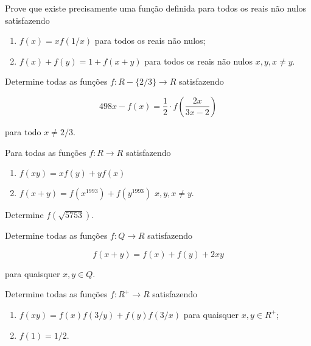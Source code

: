 \begin{questao}
  Prove que existe precisamente uma função definida para todos os reais não
  nulos satisfazendo


  \begin{enumerate}

  \item $f(x) = xf(1/x)$ para todos os reais não nulos;

  \item $f(x)+f(y) = 1 + f(x+y)$ para todos os reais não nulos $x,y, x \not =
    y$.
  \end{enumerate}

\end{questao}

\begin{questao}
  Determine todas as funções $f: R-\{2/3\} \rightarrow {R}$ satisfazendo

  $$ 498x - f(x) = \frac{1}{2} \cdot f \left(\frac{2x}{3x-2} \right) $$

  para todo $x \not= 2/3$.
\end{questao}

\begin{questao}
  Para todas as funções $f: R \rightarrow R$ satisfazendo


  \begin{enumerate}

  \item $f(xy) = xf(y)+yf(x)$

  \item $f(x+y)=f(x^{1993})+f(y^{1993})$ $x,y, x \not = y$.
  \end{enumerate}

  Determine $f(\sqrt{5753})$.
\end{questao}

\begin{questao}
  Determine todas as funções $f: Q \rightarrow R$ satisfazendo

  $$f(x+y)=f(x)+f(y)+2xy$$

  para quaisquer $x,y \in Q$.
\end{questao}

\begin{questao}
  Determine todas as funções $f: R^+ \rightarrow R$ satisfazendo


  \begin{enumerate}

  \item $f(xy) = f(x)f(3/y) + f(y)f(3/x)$ para quaisquer $x,y \in R^+$;

  \item $f(1)=1/2$.
  \end{enumerate}

\end{questao}

